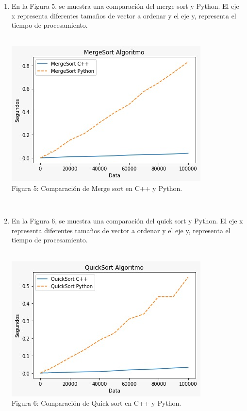 \documentclass{article}
\begin{document}
\begin{enumerate}
\begin{enumerate}
        \item En la Figura 5, se muestra una comparación del merge sort y Python. El eje x representa diferentes tamaños de vector a ordenar y el eje y, representa
            el tiempo de procesamiento.\\\\
    
        \begin{figure5}
        \includegraphics{merge.jpeg}\\
        \caption{Figura 5: Comparación de Merge sort en C++ y Python.}
        \centering
        \end{figure5}\\
        \clearpage
        
        \item En la Figura 6, se muestra una comparación del quick sort y Python. El eje x representa diferentes tamaños de vector a ordenar y el eje y, representa
            el tiempo de procesamiento.\\\\
    
        \begin{figure6}
        \includegraphics{quick.jpeg}\\
        \caption{Figura 6: Comparación de Quick sort en C++ y Python.}
        \centering
        \end{figure6}\\
        \clearpage
        

\end{enumerate}
\end{enumerate}
\end{document}
